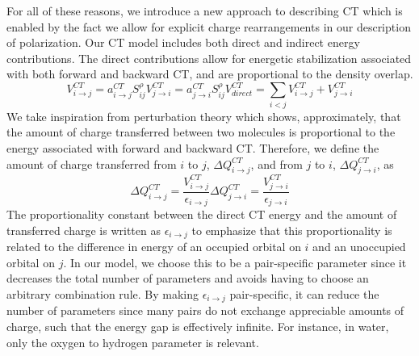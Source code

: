 \documentclass[journal=jctcce,manuscript=article]{achemso}
\begin{document}
For all of these reasons, we introduce a new approach to describing CT which is enabled by the fact we allow for explicit charge rearrangements in our description of polarization. Our CT model includes both direct and indirect energy contributions. The direct contributions allow for energetic stabilization associated with both forward and backward CT, and are proportional to the density overlap.
\begin{subequations}
  \begin{equation}
  V^{CT}_{i\rightarrow j}=a_{i\rightarrow j}^{CT}S_{ij}^\rho
\end{equation}
\begin{equation}
  V^{CT}_{j\rightarrow i}=a_{j\rightarrow i}^{CT}S_{ij}^\rho
\end{equation}
\begin{equation}
  V^{CT}_{direct}=\sum_{i<j}V^{CT}_{i\rightarrow j}+V^{CT}_{j\rightarrow i}
\end{equation}
  \label{eq:ct_direct}
\end{subequations}
We take inspiration from perturbation theory which shows, approximately, that the amount of charge transferred between two molecules is proportional to the energy associated with forward and backward CT.\cite{khaliullin2007,khaliullin2008analysis,khaliullin2009electron} Therefore, we define the amount of charge transferred from $i$ to $j$, $\Delta Q^{CT}_{i\rightarrow j}$, and from $j$ to $i$, $\Delta Q^{CT}_{j\rightarrow i}$, as
\begin{subequations}
  \begin{equation}
  \Delta Q^{CT}_{i\rightarrow j}=\frac{V^{CT}_{i\rightarrow j}}{\epsilon_{i\rightarrow j}}
\label{eq:ct_forward}
\end{equation}
\begin{equation}
  \Delta Q^{CT}_{j\rightarrow i}=\frac{V^{CT}_{j\rightarrow i}}{\epsilon_{j\rightarrow i}}
\end{equation}
\end{subequations}
The proportionality constant between the direct CT energy and the amount of transferred charge is written as $\epsilon_{i\rightarrow j}$ to emphasize that this proportionality is related to the difference in energy of an occupied orbital on $i$ and an unoccupied orbital on $j$.\cite{khaliullin2007} In our model, we choose this to be a pair-specific parameter since it decreases the total number of parameters and avoids having to choose an arbitrary combination rule. By making $\epsilon_{i\rightarrow j}$ pair-specific, it can reduce the number of parameters since many pairs do not exchange appreciable amounts of charge, such that the energy gap is effectively infinite. For instance, in water, only the oxygen to hydrogen parameter is relevant.
\end{document}
